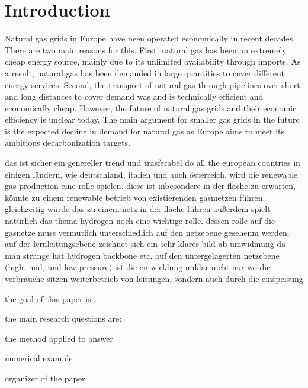 \section{Introduction}

Natural gas grids in Europe have been operated economically in recent decades. There are two main reasons for this. First, natural gas has been an extremely cheap energy source, mainly due to its unlimited availability through imports. As a result, natural gas has been demanded in large quantities to cover different energy services. Second, the transport of natural gas through pipelines over short and long distances to cover demand was and is technically efficient and economically cheap. However, the future of natural gas grids and their economic efficiency is unclear today. The main argument for smaller gas grids in the future is the expected decline in demand for natural gas as Europe aims to meet its ambitious decarbonization targets. 


das ist sicher ein genereller trend und trasferabel do all the european countries
in einigen ländern, wie deutschland, italien und auch österreich, wird die renewable gas production eine rolle spielen.
diese ist inbesondere in der fläche zu erwarten, könnte zu einem renewable betrieb von existierenden gasmetzen führen.
gleichzeitig würde das zu einem netz in der fläche führen 
außerdem spielt natürlich das thema hydrogen noch eine wichtige rolle. dessen rolle auf die gasnetze muss vermutlich unterschiedlich auf den netzebene gesehenm werden.
auf der fernleitungsebene zeichnet sich ein sehr klares bild ab
umwidmung da man stränge hat 
hydrogen backbone etc.
auf den untergelagerten netzebene (high. mid, und low pressure) ist die entwicklung unklar 
nicht nur wo die verbräuche sitzen weiterbetrieb von leitungen, sondern auch durch die einspeisung

the goal of this paper is...

the main research questions are:

the method applied to answer

numerical example

organizer of the paper




